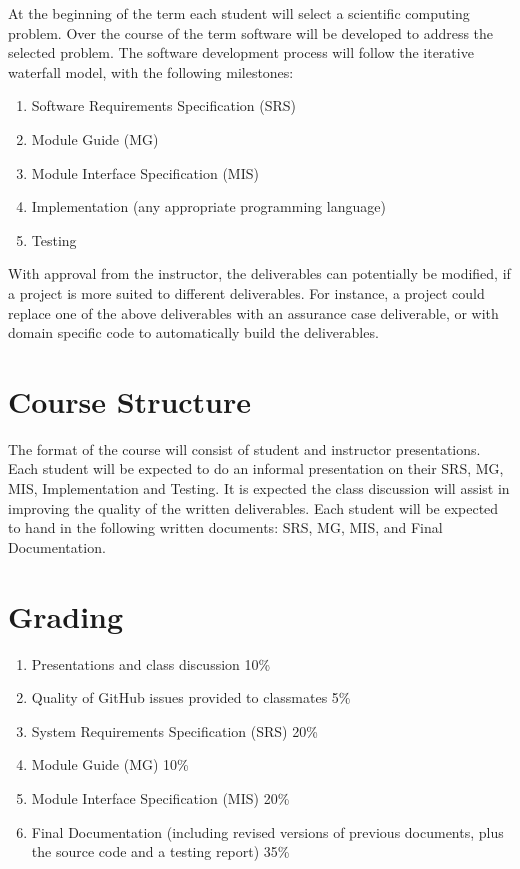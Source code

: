 \documentclass[12pt]{article}
\begin{document}
At the beginning of the term each student will select a scientific computing
problem.  Over the course of the term software will be developed to address the
selected problem.  The software development process will follow the iterative
waterfall model, with the following milestones:

\begin {enumerate}

\item Software Requirements Specification (SRS)
\item Module Guide (MG)
\item Module Interface Specification (MIS)
\item Implementation (any appropriate programming language)
\item Testing

\end {enumerate}

With approval from the instructor, the deliverables can potentially be modified,
if a project is more suited to different deliverables.  For instance, a project
could replace one of the above deliverables with an assurance case deliverable,
or with domain specific code to automatically build the deliverables.

\section {Course Structure}

The format of the course will consist of student and instructor presentations.
Each student will be expected to do an informal presentation on their SRS, MG,
MIS, Implementation and Testing.  It is expected the class discussion will
assist in improving the quality of the written deliverables.  Each student will
be expected to hand in the following written documents: SRS, MG, MIS, and Final
Documentation.

\section {Grading}

\begin {enumerate}

\item Presentations and class discussion 10\%

\item Quality of GitHub issues provided to classmates 5\%

\item System Requirements Specification (SRS) 20\%

\item Module Guide (MG) 10\%

\item Module Interface Specification (MIS) 20\%

\item Final Documentation (including revised versions of previous documents,
  plus the source code and a testing report) 35\%

\end {enumerate}
\end{document}
